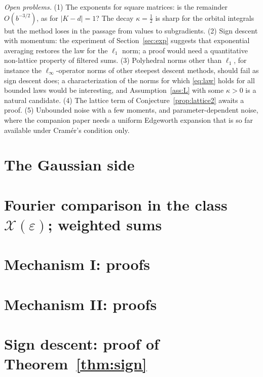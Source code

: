 \documentclass[anon,12pt]{colt2026}
\begin{document}
\emph{Open problems.} (1) The exponents for square matrices: is the remainder $O(b^{-3/2})$, as for $|K-d|=1$? The
decay $\kappa=\frac12$ is sharp for the orbital integrals but the method loses in the passage from values to
subgradients. (2) Sign descent with momentum: the experiment of
Section~\ref{sec:exp} suggests that exponential averaging restores the law for the $\ell_1$ norm; a proof would need a
quantitative non-lattice property of filtered sums. (3) Polyhedral norms other than $\ell_1$, for instance the $\ell_\infty$-operator norms of other steepest
descent methods, should fail as sign descent does; a characterization of the norms for which \eqref{eq:law} holds for
all bounded laws would be interesting, and Assumption~\ref{ass:L} with some $\kappa>0$ is a natural candidate. (4) The
lattice term of Conjecture~\ref{prop:lattice2} awaits a proof. (5) Unbounded noise with a few moments, and
parameter-dependent noise, where the companion paper needs a uniform Edgeworth expansion that is so far available
under Cram\'er's condition only.



\appendix
\section{The Gaussian side}\label{app:gauss}


\section{Fourier comparison in the class $\mathcal X(\varepsilon)$; weighted sums}\label{app:fourier}


\section{Mechanism I: proofs}\label{app:codim}


\section{Mechanism II: proofs}\label{app:laplace}



\section{Sign descent: proof of Theorem~\ref{thm:sign}}\label{app:sign}

\end{document}

